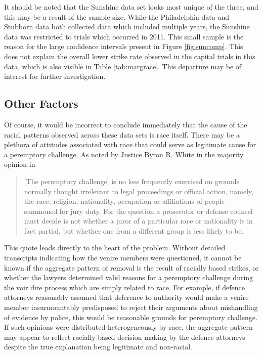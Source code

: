 It should be noted that the Sunshine data set looks most unique of the three, and this may be a result of the sample size. While
the Philadelphia data and Stubborn data both collected data which included multiple years, the Sunshine data was restricted to
trials which occurred in 2011. This small sample is the reason for the large confidence intervals present in Figure
\ref{fig:suncomp}. This does not explain the overall lower strike rate observed in the capital trials in this data, which is also
visible in Table \ref{tab:margrace}. This departure may be of interest for further investigation.

\subsection{Other Factors} \label{sec:otherfact}

Of course, it would be incorrect to conclude immediately that the cause of the racial patterns observed across these data sets is
race itself. There may be a plethora of attitudes associated with race that could serve as legitimate cause for a peremptory
challenge. As noted by Justice Byron R. White in the majority opinion in \cite{swainvalabama}

\begin{quote}
  [The peremptory challenge] is no less frequently exercised on grounds normally thought irrelevant to legal proceedings or
  official action, namely, the race, religion, nationality, occupation or affiliations of people summoned for jury duty. For the
  question a prosecutor or defense counsel must decide is not whether a juror of a particular race or nationality is in fact
  partial, but whether one from a different group is less likely to be.
\end{quote}

This quote leads directly to the heart of the problem. Without detailed transcripts indicating how the venire members were
questioned, it cannot be known if the aggregate pattern of removal is the result of racially based strikes, or whether the lawyers
determined valid reasons for a peremptory challenge during the voir dire process which are simply related to race. For example, if
defence attorneys reasonably assumed that deference to authority would make a venire member insurmountably predisposed to reject
their arguments about mishandling of evidence by police, this would be reasonable grounds for
peremptory challenge. If such opinions were distributed heterogeneously by race, the aggregate pattern may appear to reflect
racially-based decision making by the defence attorneys despite the
true explanation being legitimate and non-racial.


